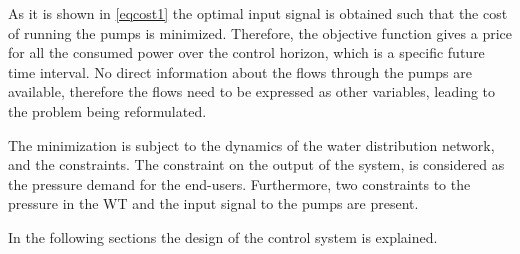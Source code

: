 As it is shown in \eqref{eqcost1} the optimal input signal is obtained such that the cost of running the pumps is minimized. Therefore, the objective function gives a price for all the consumed power over the control horizon, which is a specific future time interval. No direct information about the flows through the pumps are available, therefore the flows need to be expressed as other variables, leading to the problem being reformulated.

The minimization is subject to the dynamics of the water distribution network, and the constraints. The constraint on the output of the system, is considered as the pressure demand for the end-users. Furthermore, two constraints to the pressure in the WT and the input signal to the pumps are present. 

In the following sections the design of the control system is explained. 







